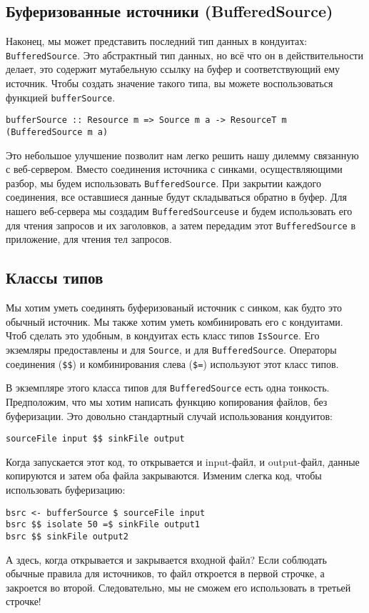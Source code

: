 \subsection{Буферизованные источники (BufferedSource)}
Наконец, мы может представить последний тип данных в кондуитах: 
\lstinline'BufferedSource'. Это абстрактный тип данных, но всё что он в 
действительности делает, это содержит мутабельную ссылку на буфер и 
соответствующий ему источник. Чтобы создать значение такого типа, вы можете 
воспользоваться функцией \lstinline'bufferSource'.
\begin{verbatim}
bufferSource :: Resource m => Source m a -> ResourceT m (BufferedSource m a)
\end{verbatim}
Это небольшое улучшение позволит нам легко решить нашу дилемму связанную с 
веб-сервером. Вместо соединения источника с синками, осуществляющими разбор, 
мы будем использовать \lstinline'BufferedSource'. При закрытии каждого 
соединения, все оставшиеся данные будут складываться обратно в буфер. 
Для нашего веб-сервера мы создадим \lstinline'BufferedSourceuse' и будем 
использовать его для чтения запросов и их заголовков, а затем передадим этот 
\lstinline'BufferedSource' в приложение, для чтения тел запросов.

\subsection{Классы типов}
Мы хотим уметь соединять буферизованый источник с синком, как будто это обычный источник.
Мы также хотим уметь комбинировать его с кондуитами. Чтоб сделать это удобным, в кондуитах
есть класс типов \lstinline'IsSource'. Его экземляры предоставлены и для
\lstinline'Source', и для \lstinline'BufferedSource'. 
Операторы соединения (\verb#$$#) и комбинирования слева (\verb#$=#) используют этот класс типов.

В экземпляре этого класса типов для \lstinline'BufferedSource' есть одна тонкость.
Предположим, что мы хотим написать функцию копирования файлов, без
буферизации. Это довольно стандартный случай использования кондуитов:
\begin{lstlisting}
sourceFile input $$ sinkFile output
\end{lstlisting}
Когда запускается этот код, то открывается и input-файл, и output-файл, данные 
копируются и затем оба файла закрываются. Изменим слегка код, чтобы 
использовать буферизацию:
\begin{lstlisting}
bsrc <- bufferSource $ sourceFile input
bsrc $$ isolate 50 =$ sinkFile output1
bsrc $$ sinkFile output2
\end{lstlisting}
А здесь, когда открывается и закрывается входной файл? Если соблюдать обычные 
правила для источников, то файл откроется в первой строчке, а закроется во 
второй. Следовательно, мы не сможем его использовать в третьей строчке!


